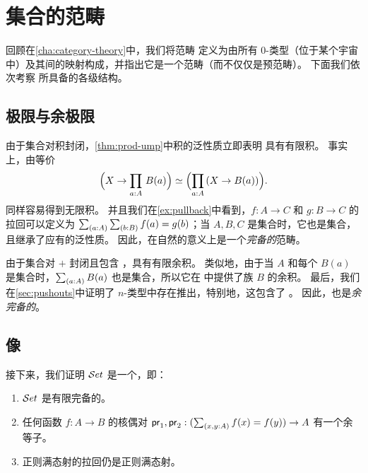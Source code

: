 \section{集合的范畴}
\label{sec:piw-pretopos}

回顾在\cref{cha:category-theory}中，我们将范畴 \uset 定义为由所有 $0$-类型（位于某个宇宙 \UU 中）及其间的映射构成，并指出它是一个范畴（而不仅仅是预范畴）。
下面我们依次考察 \uset 所具备的各级结构。

\subsection{极限与余极限}
\label{subsec:limits-sets}

%
%

由于集合对积封闭，\cref{thm:prod-ump}中积的泛性质立即表明 \uset 具有有限积。
事实上，由等价 \[ \Parens{X\to \prd{a:A} B(a)} \eqvsym \Parens{\prd{a:A} (X\to B(a))}.\] 同样容易得到无限积。
并且我们在\cref{ex:pullback}中看到，$f:A\to C$ 和 $g:B\to C$ 的拉回可以定义为 $\sm{a:A}{b:B} f(a)=g(b)$；当 $A,B,C$ 是集合时，它也是集合，且继承了应有的泛性质。
因此，\uset 在自然的意义上是一个\emph{完备的}范畴。
%
%

由于集合对 $+$ 封闭且包含 \emptyt，\uset 具有有限余积。
类似地，由于当 $A$ 和每个 $B(a)$ 是集合时，$\sm{a:A}B(a)$ 也是集合，所以它在 \uset 中提供了族 $B$ 的余积。
最后，我们在\cref{sec:pushouts}中证明了 $n$-类型中存在推出，特别地，这包含了 \uset。
因此，\uset 也是\emph{余完备的}。
%
%

\subsection{像}
\label{sec:image}

接下来，我们证明 $\mathcal{S}et$ 是一个，即：
%
%
%

\begin{enumerate}
\item $\mathcal{S}et$ 是有限完备的。\label{item:reg1}
\item 任何函数 $f : A \to B$ 的核偶对 $\proj1,\proj2: (\sm{x,y:A} f(x)= f(y)) \to A$ 有一个余等子。\label{item:reg2}
\item 正则满态射的拉回仍是正则满态射。\label{item:reg3}
\end{enumerate}

